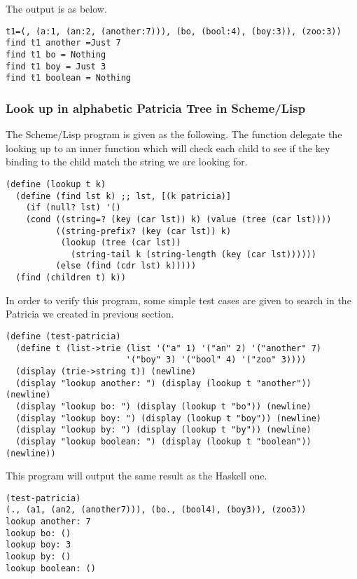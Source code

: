 \documentclass{article}
\begin{document}
The output is as below.

\begin{verbatim}
t1=(, (a:1, (an:2, (another:7))), (bo, (bool:4), (boy:3)), (zoo:3))
find t1 another =Just 7
find t1 bo = Nothing
find t1 boy = Just 3
find t1 boolean = Nothing
\end{verbatim}


\subsubsection*{Look up in alphabetic Patricia Tree in Scheme/Lisp}

The Scheme/Lisp program is given as the following. The function
delegate the looking up to an inner function which will check each
child to see if the key binding to the child match the string we are
looking for.

\lstset{language=lisp}
\begin{lstlisting}
(define (lookup t k)
  (define (find lst k) ;; lst, [(k patricia)]
    (if (null? lst) '()
	(cond ((string=? (key (car lst)) k) (value (tree (car lst))))
	      ((string-prefix? (key (car lst)) k)
	       (lookup (tree (car lst)) 
		     (string-tail k (string-length (key (car lst))))))
	      (else (find (cdr lst) k)))))
  (find (children t) k))
\end{lstlisting}

In order to verify this program, some simple test cases are given to
search in the Patricia we created in previous section.

\begin{lstlisting}
(define (test-patricia)
  (define t (list->trie (list '("a" 1) '("an" 2) '("another" 7) 
                        '("boy" 3) '("bool" 4) '("zoo" 3))))
  (display (trie->string t)) (newline)
  (display "lookup another: ") (display (lookup t "another")) (newline)
  (display "lookup bo: ") (display (lookup t "bo")) (newline)
  (display "lookup boy: ") (display (lookup t "boy")) (newline)
  (display "lookup by: ") (display (lookup t "by")) (newline)
  (display "lookup boolean: ") (display (lookup t "boolean")) (newline))
\end{lstlisting}

This program will output the same result as the Haskell one.

\begin{lstlisting}
(test-patricia)
(., (a1, (an2, (another7))), (bo., (bool4), (boy3)), (zoo3))
lookup another: 7
lookup bo: ()
lookup boy: 3
lookup by: ()
lookup boolean: ()
\end{lstlisting}
\end{document}
